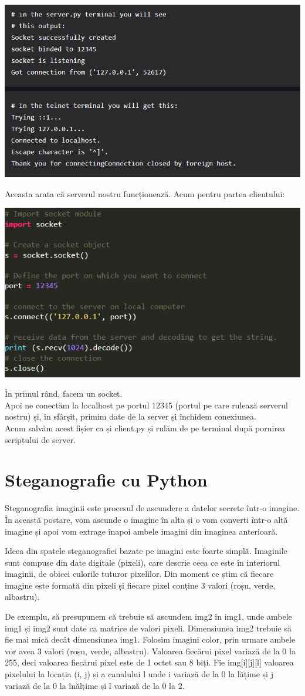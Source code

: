 \documentclass[oneside,20pt]{article}          %
\begin{document}
 \begin{center}
\includegraphics[height = 4 cm]{6.png}
\end{center}
Aceasta arata că serverul nostru funcționează.
Acum pentru partea clientului:
 \begin{center}
\includegraphics[height = 4 cm]{7.png}
\end{center}

În primul rând, facem un socket.\\
Apoi ne conectăm la localhost pe portul 12345 (portul pe care rulează serverul nostru) și, în sfârșit, primim date de la server și închidem conexiunea.\\
Acum salvăm acest fișier ca și client.py și rulăm de pe terminal după pornirea scriptului de server.\\

\section{Steganografie cu Python}
Steganografia imaginii este procesul de ascundere a datelor secrete într-o imagine. În această postare, vom ascunde o imagine în alta și o vom converti într-o altă imagine și apoi vom extrage înapoi ambele imagini din imaginea anterioară.

Ideea din spatele steganografiei bazate pe imagini este foarte simplă. Imaginile sunt compuse din date digitale (pixeli), care descrie ceea ce este în interiorul imaginii, de obicei culorile tuturor pixelilor. Din moment ce știm că fiecare imagine este formată din pixeli și fiecare pixel conține 3 valori (roșu, verde, albastru).

De exemplu, să presupunem că trebuie să ascundem img2 în img1, unde ambele img1 și img2 sunt date ca matrice de valori pixeli. Dimensiunea img2 trebuie să fie mai mică decât dimensiunea img1. Folosim imagini color, prin urmare ambele vor avea 3 valori (roșu, verde, albastru). Valoarea fiecărui pixel variază de la 0 la 255, deci valoarea fiecărui pixel este de 1 octet sau 8 biți. Fie img[i][j][l] valoarea pixelului la locația (i, j) și a canalului l unde i variază de la 0 la lățime și j variază de la 0 la înălțime și l variază de la 0 la 2.
\end{document}
